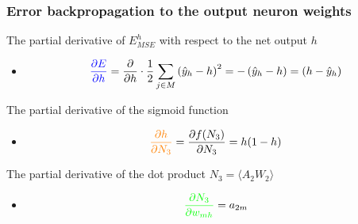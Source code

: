 \documentclass[proffesionalfonts]{beamer}
\begin{document}
\begin{frame}
\frametitle{Error backpropagation to the output neuron weights}
\begin{block}{The partial derivative of $E_{MSE}^h$ with respect to the net output $h$}
\begin{itemize}
\item[\ ]
\[ \textcolor{blue}{\frac{ \partial E }{ \partial h }} = \frac{\partial }{\partial h} \cdot \frac{1}{2} \sum_{j \in M} \left(\hat{y}_h - h \right)^2 = -\left(\hat{y}_h - h \right) = \left( h - \hat{y}_h\right)\]
\end{itemize}
\end{block}
\begin{block}{The partial derivative of the sigmoid function }
\begin{itemize}
\item[\ ]
\[ \textcolor{orange}{\frac{ \partial h }{ \partial N_3 }} = \frac{ \partial f(N_3) }{ \partial N_3 } = h(1 - h) \]
\end{itemize}
\end{block}
\begin{block}{The partial derivative of the dot product $N_3 = \langle A_2 W_2 \rangle$}
\begin{itemize}
\item[\ ]
\[ \textcolor{green}{\frac{ \partial N_3 }{ \partial w_{mh} }} = a_{2m} \]
\end{itemize}
\end{block}
\end{frame}
\end{document}
